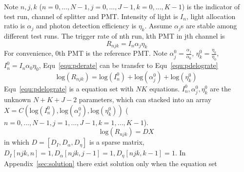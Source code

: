 Note $n,j,k$ ($n=0,...,N-1, j=0,...,J-1, k=0,...,K-1$) is the indicator of test run, channel of splitter and PMT. Intensity of light is $I_n$, light allocation ratio is $\alpha_j$ and photon detection efficiency is $\eta_k$. Assume $\alpha_j$s are stable among different test runs. The trigger rate of nth run, kth PMT in jth channel is
\begin{equation}
    \label{equ:pderate}
    R_{njk}=I_n\alpha_j\eta_k
\end{equation}
For convenience, 0th PMT is the reference PMT. Note $\alpha_j^0=\frac{\alpha_j}{\alpha_0}$, $\eta_k^0=\frac{\eta_k}{\eta_0}$, $I_n^0=I_n\alpha_0\eta_0$, Equ~\eqref{equ:pderate} can be transfer to Equ~\eqref{equ:pdelograte}
\begin{equation}
    \label{equ:pdelograte}
    \mathrm{log}(R_{njk})=\mathrm{log}(I_n^0)+\mathrm{log}(\alpha_j^0)+\mathrm{log}(\eta_k^0)
\end{equation}
Equ~\eqref{equ:pdelograte} is a equation set with $NK$ equations. $I_n^0,\alpha_j^0,\eta_k^0$ are the unknown $N+K+J-2$ parameters, which can stacked into an array $X = C(\mathrm{log}(I_n^0), \mathrm{log}(\alpha_j^0),\mathrm{log}(\eta_k^0))$ ($n=0,...,N-1, j=1,...,J-1, k=1,...,K-1$). 
\begin{equation}
    \mathrm{log}(R_{njk})=DX
\end{equation}
in which $D=[D_I,D_\alpha, D_\eta]$ is a sparse matrix, $D_I[{njk},n]=1,D_\alpha[{njk},j-1]=1, D_\eta[{njk},k-1]=1$. 
In Appendix~\ref{sec:solution} there exist solution only when the  equation set
